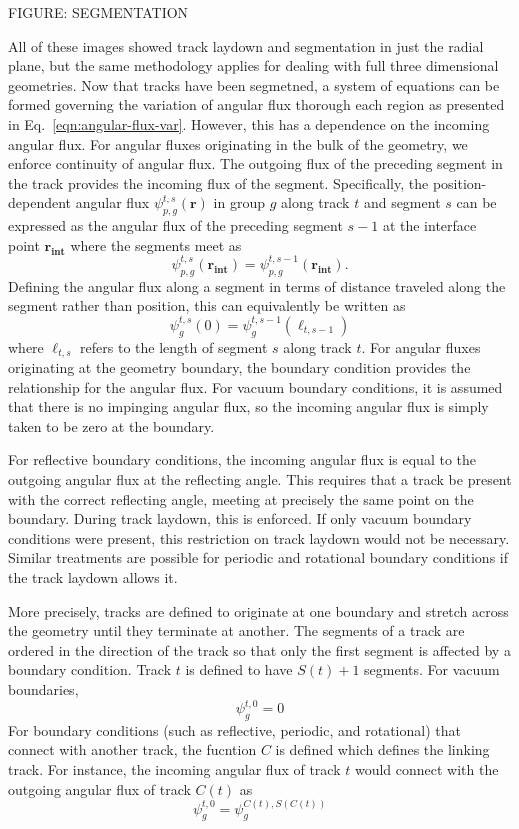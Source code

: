 FIGURE: SEGMENTATION

All of these images showed track laydown and segmentation in just the radial plane, but the same methodology applies for dealing with full three dimensional geometries. Now that tracks have been segmetned, a system of equations can be formed governing the variation of angular flux thorough each region as presented in Eq.~\ref{eqn:angular-flux-var}. However, this has a dependence on the incoming angular flux. For angular fluxes originating in the bulk of the geometry, we enforce continuity of angular flux. The outgoing flux of the preceding segment in the track provides the incoming flux of the segment. Specifically, the position-dependent angular flux $\psi_{p,g}^{t,s}(\mathbf{r})$ in group $g$ along track $t$ and segment $s$ can be expressed as the angular flux of the preceding segment $s-1$ at the interface point $\mathbf{r_{\textbf{int}}}$ where the segments meet as
\begin{dmath}
	\psi_{p,g}^{t,s}(\mathbf{r_{\textbf{int}}}) = \psi_{p,g}^{t,s-1}(\mathbf{r_{\textbf{int}}}).
\end{dmath}
Defining the angular flux along a segment in terms of distance traveled along the segment rather than position, this can equivalently be written as
\begin{dmath}
	\psi_g^{t,s}(0) = \psi_g^{t,s-1}(\ell_{t,s-1})
	\label{eqn:angular_flux_boundary}
\end{dmath}
where $\ell_{t,s}$ refers to the length of segment $s$ along track $t$. For angular fluxes originating at the geometry boundary, the boundary condition provides the relationship for the angular flux. For vacuum boundary conditions, it is assumed that there is no impinging angular flux, so the incoming angular flux is simply taken to be zero at the boundary. 

For reflective boundary conditions, the incoming angular flux is equal to the outgoing angular flux at the reflecting angle. This requires that a track be present with the correct reflecting angle, meeting at precisely the same point on the boundary. During track laydown, this is enforced. If only vacuum boundary conditions were present, this restriction on track laydown would not be necessary. Similar treatments are possible for periodic and rotational boundary conditions if the track laydown allows it. 

More precisely, tracks are defined to originate at one boundary and stretch across the geometry until they terminate at another. The segments of a track are ordered in the direction of the track so that only the first segment is affected by a boundary condition. Track $t$ is defined to have $S(t)+1$ segments. For vacuum boundaries,
\begin{dmath}
	\psi_g^{t,0} = 0
\end{dmath}
For boundary conditions (such as reflective, periodic, and rotational) that connect with another track, the fucntion $C$ is defined which defines the linking track. For instance, the incoming angular flux of track $t$ would connect with the outgoing angular flux of track $C(t)$ as
\begin{dmath}
	\psi_g^{t,0} = \psi_g^{C(t),S(C(t))}
	\label{eqn:linking-bc}
\end{dmath}

